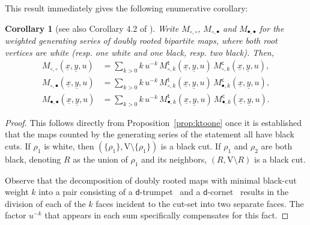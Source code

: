\documentclass[11pt,reqno,tbtags]{amsart}
\newcommand{\rV}{\mathrm{V}}
\newcommand{\ux}{\underline{x}}
\newcommand{\uy}{\underline{y}}
\newtheorem{coro}[theo]{Corollary}
\numberwithin{equation}{section}
\numberwithin{theo}{section}
\theoremstyle{definition}
\newcommand{\dtrum}{$\mathsf{d}$-trumpet}
\newcommand{\dcorn}{$\mathsf{d}$-cornet}
\begin{document}
This result immediately gives the following enumerative corollary: 
\begin{coro}[see also Corollary 4.2 of \cite{AlbenqueBouttier_slices}]\label{coro:doubly_rooted}
Write $M_{\circ,\circ}$, $M_{\circ,\bullet}$ and $M_{\bullet,\bullet}$ for the weighted generating series of doubly rooted bipartite maps, where both root vertices are white (resp. one white and one black, resp. two black). Then,
\begin{align*}
    M_{\circ,\circ}(\ux,\uy, u) &= \sum_{k >0} k \, u^{-k} \, M^\mathsf{t}_{\circ,k} (\ux,\uy, u) \, M^\mathsf{c}_{\circ,k} (\ux,\uy, u),\\
    M_{\circ,\bullet}(\ux,\uy, u) &= \sum_{k >0} k \, u^{-k} \, M^\mathsf{t}_{\circ,k} (\ux,\uy, u) \, M^\mathsf{c}_{\bullet,k} (\ux,\uy, u),\\
    M_{\bullet,\bullet}(\ux,\uy, u) &= \sum_{k >0} k \, u^{-k} \, M^\mathsf{t}_{\bullet,k} (\ux,\uy, u) \, M^\mathsf{c}_{\bullet,k} (\ux,\uy, u).
\end{align*}
\end{coro}

\begin{proof}
    This follows directly from Proposition~\ref{prop:ktoone} once it is established that the maps counted by the generating series of the statement all have black cuts. If $\rho_1$ is white, then $(\{\rho_1\} , \rV \setminus \{\rho_1 \})$ is a black cut. If $\rho_1$ and $\rho_2$ are both black, denoting $R$ as the union of  $\rho_1$ and its neighbors, $(R, \rV \setminus R)$ is a black cut. 
    
   Observe that the decomposition of doubly rooted maps with minimal black-cut weight  $k$ into a pair consisting of a  \dtrum~ and a  \dcorn~ results in the division of each of the  $k$ faces incident to the cut-set into two separate faces. The factor $u^{-k}$ that appears in each sum specifically compensates for this fact.
\end{proof}


\end{document}
